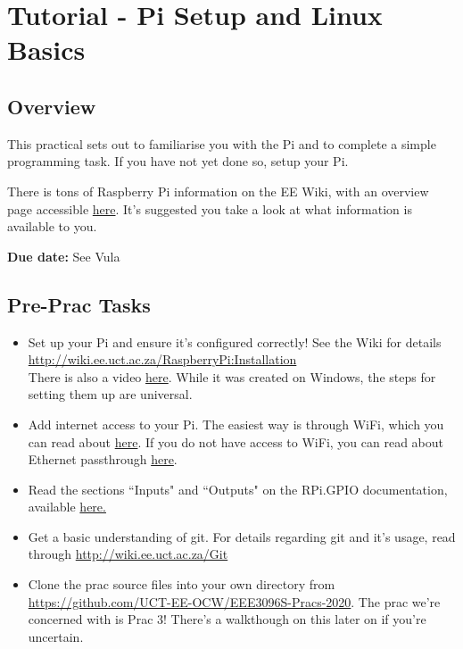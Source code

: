 \section{Tutorial - Pi Setup and Linux Basics}
\subsection{Overview}
This practical sets out to familiarise you with the Pi and to complete a simple programming task. If you have not yet done so, setup your Pi. 

There is tons of Raspberry Pi information on the EE Wiki, with an overview page accessible \href{http://wiki.ee.uct.ac.za/RaspberryPi:Overview}{here}. It's suggested you take a look at what information is available to you.

\textbf{Due date:} See Vula

\subsection{Pre-Prac Tasks}
\begin{itemize}
\itemsep0em 
    \item Set up your Pi and ensure it's configured correctly! See the Wiki for details \href{http://wiki.ee.uct.ac.za/RaspberryPi:Installation}{http://wiki.ee.uct.ac.za/RaspberryPi:Installation}\\
    There is also a video \href{https://www.youtube.com/watch?v=2vqEQVoK58M}{here}. While it was created on Windows, the steps for setting them up are universal.\\
    \item Add internet access to your Pi. The easiest way is through WiFi, which you can read about \href{http://wiki.ee.uct.ac.za/RaspberryPi:Networking#Simple_Wifi_Connections}{here}. If you do not have access to WiFi, you can read about Ethernet passthrough \href{http://wiki.ee.uct.ac.za/RaspberryPi:Networking#Internet_Access_over_USB}{here}.
    \item Read the sections ``Inputs" and ``Outputs" on the RPi.GPIO documentation, available \href{https://sourceforge.net/p/raspberry-gpio-python/wiki/Examples/}{here.}
    \item Get a basic understanding of git. For details regarding git and it's usage, read through \href{http://wiki.ee.uct.ac.za/Git}{http://wiki.ee.uct.ac.za/Git}
    \item Clone the prac source files into your own directory from \href{https://github.com/UCT-EE-OCW/EEE3096S-Pracs-2020}{https://github.com/UCT-EE-OCW/EEE3096S-Pracs-2020}. The prac we're concerned with is Prac 3! There's a walkthough on this later on if you're uncertain.

\end{itemize}


